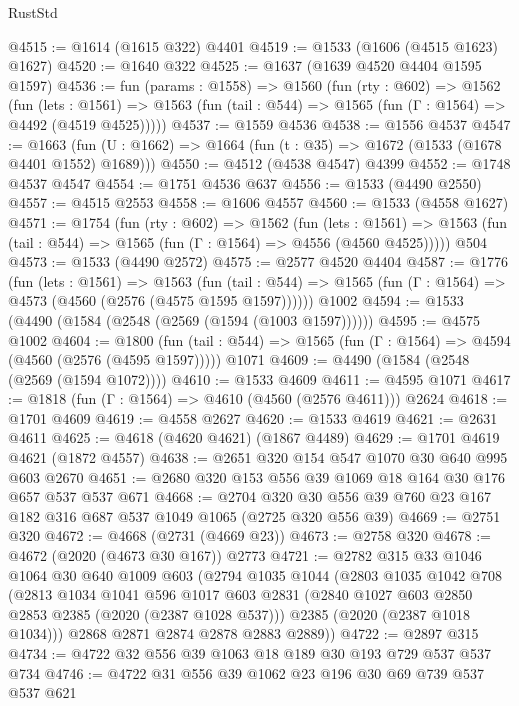 \begin{lexlean}{RustStd}
\begin{coremodule}
@4515 := @1614 (@1615 @322) @4401
@4519 := @1533 (@1606 (@4515 @1623) @1627)
@4520 := @1640 @322
@4525 := @1637 (@1639 @4520 @4404 @1595 @1597)
@4536 := fun (params : @1558) =>
  @1560
    (fun (rty : @602) =>
    @1562
      (fun (lets : @1561) =>
      @1563 (fun (tail : @544) => @1565 (fun (Γ : @1564) => @4492 (@4519 @4525)))))
@4537 := @1559 @4536
@4538 := @1556 @4537
@4547 := @1663 (fun (U : @1662) => @1664 (fun (t : @35) => @1672 (@1533 (@1678 @4401 @1552) @1689)))
@4550 := @4512 (@4538 @4547) @4399
@4552 := @1748 @4537 @4547
@4554 := @1751 @4536 @637
@4556 := @1533 (@4490 @2550)
@4557 := @4515 @2553
@4558 := @1606 @4557
@4560 := @1533 (@4558 @1627)
@4571 := @1754
    (fun (rty : @602) =>
    @1562
      (fun (lets : @1561) =>
      @1563 (fun (tail : @544) => @1565 (fun (Γ : @1564) => @4556 (@4560 @4525)))))
    @504
@4573 := @1533 (@4490 @2572)
@4575 := @2577 @4520 @4404
@4587 := @1776
    (fun (lets : @1561) =>
    @1563
      (fun (tail : @544) => @1565 (fun (Γ : @1564) => @4573 (@4560 (@2576 (@4575 @1595 @1597))))))
    @1002
@4594 := @1533 (@4490 (@1584 (@2548 (@2569 (@1594 (@1003 @1597))))))
@4595 := @4575 @1002
@4604 := @1800
    (fun (tail : @544) => @1565 (fun (Γ : @1564) => @4594 (@4560 (@2576 (@4595 @1597)))))
    @1071
@4609 := @4490 (@1584 (@2548 (@2569 (@1594 @1072))))
@4610 := @1533 @4609
@4611 := @4595 @1071
@4617 := @1818 (fun (Γ : @1564) => @4610 (@4560 (@2576 @4611))) @2624
@4618 := @1701 @4609
@4619 := @4558 @2627
@4620 := @1533 @4619
@4621 := @2631 @4611
@4625 := @4618 (@4620 @4621) (@1867 @4489)
@4629 := @1701 @4619 @4621 (@1872 @4557)
@4638 := @2651 @320 @154 @547 @1070 @30 @640 @995 @603 @2670
@4651 := @2680 @320 @153 @556 @39 @1069 @18 @164 @30 @176 @657 @537 @537 @671
@4668 := @2704 @320 @30 @556 @39 @760 @23 @167 @182 @316 @687 @537 @1049 @1065 (@2725 @320 @556 @39)
@4669 := @2751 @320
@4672 := @4668 (@2731 (@4669 @23))
@4673 := @2758 @320
@4678 := @4672 (@2020 (@4673 @30 @167)) @2773
@4721 := @2782
    @315
    @33
    @1046
    @1064
    @30
    @640
    @1009
    @603
    (@2794
      @1035
      @1044
      (@2803
        @1035
        @1042
        @708
        (@2813
          @1034
          @1041
          @596
          @1017
          @603
          @2831
          (@2840 @1027 @603 @2850 @2853 @2385 (@2020 (@2387 @1028 @537)))
          @2385
          (@2020 (@2387 @1018 @1034)))
        @2868
        @2871
        @2874
        @2878
        @2883
        @2889))
@4722 := @2897 @315
@4734 := @4722 @32 @556 @39 @1063 @18 @189 @30 @193 @729 @537 @537 @734
@4746 := @4722 @31 @556 @39 @1062 @23 @196 @30 @69 @739 @537 @537 @621

\end{coremodule}
\end{lexlean}
